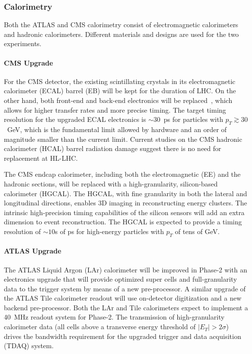 \subsubsection{Calorimetry} \label{sec:upgradecalo}

Both the ATLAS and CMS calorimetry consist of electromagnetic calorimeters and hadronic calorimeters. Different materials and designs are used for the two experiments.

\paragraph{CMS Upgrade}
For the CMS detector, the existing scintillating crystals in its electromagnetic calorimeter (ECAL) barrel (EB) will be kept for the duration of LHC. On the other hand, both front-end and back-end electronics will be replaced~\cite{Lourenco:2283187}, which allows for higher transfer rates and more precise timing. The target timing resolution for the upgraded ECAL electronics is $\sim30$~ps for particles with $p_T \gtrsim30$~GeV, which is the fundamental limit allowed by hardware and an order of magnitude smaller than the current limit. Current studies on the CMS hadronic calorimeter (HCAL) barrel radiation damage suggest there is no need for replacement at HL-LHC.

The CMS endcap calorimeter, including both the electromagnetic (EE) and the hadronic sections, will be replaced with a high-granularity, silicon-based calorimeter (HGCAL). The HGCAL, with fine granularity in both the lateral and longitudinal directions, enables 3D imaging in reconstructing energy clusters. The intrinsic high-precision timing capabilities of the silicon sensors will add an extra dimension to event reconstruction. The HGCAL is expected to provide a timing resolution of $\sim10$s of ps for high-energy particles with $p_T$ of tens of GeV.

\paragraph{ATLAS Upgrade}

The ATLAS Liquid Argon (LAr) calorimeter will be improved in Phase-2 with an electronics upgrade that will provide optimized super cells and full-granularity data to the trigger system by means of a new pre-processor. A similar upgrade of the ATLAS Tile calorimeter readout will use on-detector digitization and a new backend pre-processor. Both the LAr and Tile calorimeters expect to implement a 40~MHz readout system for Phase-2. The transmission of high-granularity calorimeter data (all cells above a transverse energy threshold of $|E_T| > 2\sigma$) %
drives the bandwidth requirement for the upgraded trigger and data acquisition (TDAQ) system.

